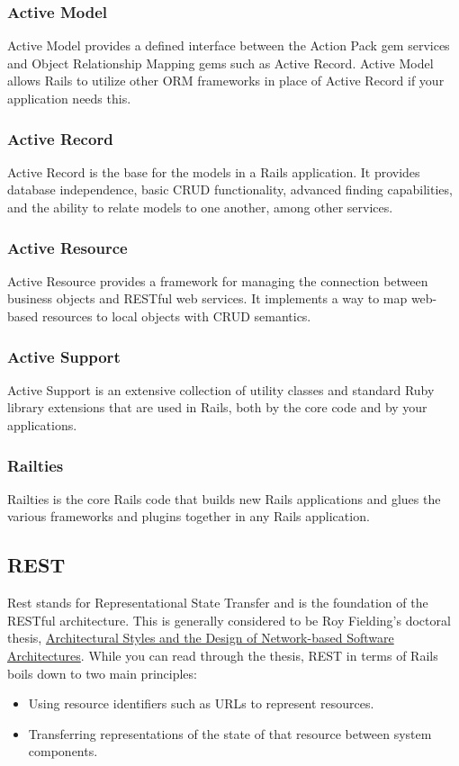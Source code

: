 \documentclass[10pt]{book}
\begin{document}
\subsubsection{ Active Model}

Active Model provides a defined interface between the Action Pack gem services and Object Relationship Mapping gems such as Active Record. Active Model allows Rails to utilize other ORM frameworks in place of Active Record if your application needs this.

\subsubsection{ Active Record}

Active Record is the base for the models in a Rails application. It provides database independence, basic CRUD functionality, advanced finding capabilities, and the ability to relate models to one another, among other services.

\subsubsection{ Active Resource}

Active Resource provides a framework for managing the connection between business objects and RESTful web services. It implements a way to map web-based resources to local objects with CRUD semantics.

\subsubsection{ Active Support}

Active Support is an extensive collection of utility classes and standard Ruby library extensions that are used in Rails, both by the core code and by your applications.

\subsubsection{ Railties}

Railties is the core Rails code that builds new Rails applications and glues the various frameworks and plugins together in any Rails application.

\subsection{ REST}

Rest stands for Representational State Transfer and is the foundation of the RESTful architecture. This is generally considered to be Roy Fielding’s doctoral thesis, \href{http://www.ics.uci.edu/%7Efielding/pubs/dissertation/top.htm}{Architectural Styles and the Design of Network-based Software Architectures}. While you can read through the thesis, REST in terms of Rails boils down to two main principles:
\begin{itemize}
	\item Using resource identifiers such as URLs to represent resources.
	\item Transferring representations of the state of that resource between system components.
\end{itemize}
\end{document}
